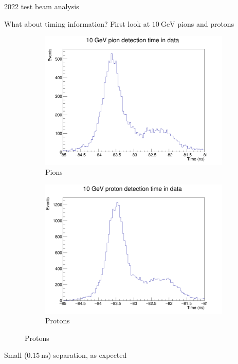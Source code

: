\documentclass[xcolor={dvipsnames}]{beamer}
\begin{document}
\begin{frame}{2022 test beam analysis}
  \begin{center}
    \Large{What about timing information? First look at $\SI{10}{\giga\eV}$ pions and protons}
  \end{center}
  \begin{figure}
    \centering
    \begin{subfigure}{0.5\textwidth}
      \includegraphics[width = 1.0\textwidth]{Figs/Time_Pos8_Pion_10GeV_Data.png}
      \caption{Pions}
    \end{subfigure}%
    \begin{subfigure}{0.5\textwidth}
      \includegraphics[width = 1.0\textwidth]{Figs/Time_Pos8_Proton_10GeV_Data.png}
      \caption{Protons}
    \end{subfigure}%
  \end{figure}
  \begin{center}
    Small ($\SI{0.15}{\nano\second}$) separation, as expected
  \end{center}
\end{frame}
\end{document}
